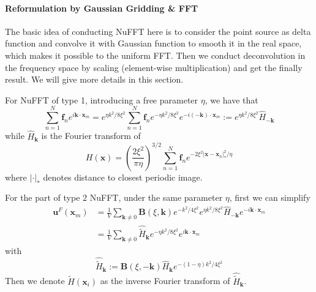 \documentclass{article}[12pt]
\begin{document}
\paragraph{Reformulation by Gaussian Gridding \& FFT} 
The basic idea of conducting NuFFT here is to consider the point source as delta function and convolve it with Gaussian function to smooth it in the real space, which makes it possible to the uniform FFT. Then we conduct deconvolution in the frequency space by scaling (element-wise multiplication) and get the finally result. We will give more details in this section.

For NuFFT of type 1, introducing a free parameter $\eta$, we have that
\begin{equation}
\sum_{n=1}^{N} \mathbf{f}_n e ^{i \mathbf{k} \cdot \mathbf{x}_m }  = e^{\eta k^2 / 8 \xi^2} \sum_{n=1}^{N} \mathbf{f}_n e^{-\eta k^2 / 8 \xi^2} e ^{-i (\mathbf{-k}) \cdot \mathbf{x}_m }  := e^{\eta k^2 / 8 \xi^2} \hat{H}_{\mathbf{-k}}
\end{equation}
while $\hat{H}_{\mathbf{k}}$ is the Fourier transform of 
\begin{equation}
H(\mathbf{x}) = \left(\frac{2 \xi^2}{\pi \eta}\right)^{3/2}  \sum_{n=1}^N \mathbf{f}_n e^{-2 \xi^2 |\mathbf{x} - \mathbf{x}_n|_{\ast}^2 / \eta} \label{eq:gaussian_gridding_1}
\end{equation}
where $|\cdot|_{\ast}$ denotes distance to closest periodic image. 

For the part of type 2 NuFFT, under the same parameter $\eta$, first we can simplify 
\begin{align}
\mathbf{u}^F (\mathbf{x}_m) & = \frac{1}{V} \sum_{\mathbf{k} \neq 0} \mathbf{B}(\xi, \mathbf{k}) e^{-k^2/4\xi^2} e^{\eta k^2 / 8 \xi^2} \hat{H}_{\mathbf{-k}} e ^{-i \mathbf{k} \cdot \mathbf{x}_m} \\
& = \frac{1}{V} \sum_{\mathbf{k} \neq 0} \hat{\tilde{H}}_{\mathbf{k}} e^{- \eta k^2 / 8 \xi^2}  e ^{i \mathbf{k} \cdot \mathbf{x}_m} 
\end{align}
with 
\begin{equation}
\hat{\tilde{H}}_{\mathbf{k}} := \mathbf{B}(\xi, \mathbf{-k}) \hat{H}_{\mathbf{k}} e^{-(1-\eta)k^2 / 4\xi^2} \label{eq:hat_tilde_h_formula}
\end{equation}
Then we denote $\tilde{H}(\mathbf{x}_i)$ as the inverse Fourier transform of $
\hat{\tilde{H}}_{\mathbf{k}}$.
\end{document}

